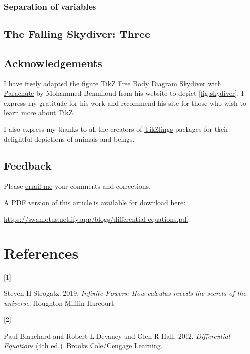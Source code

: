 \documentclass[
  a4paper,
]{article}
\newlength{\cslhangindent}
\newlength{\csllabelwidth}
\newenvironment{CSLReferences}[2] %
 {\begin{list}{}{%
  \setlength{\itemindent}{0pt}
  \setlength{\leftmargin}{0pt}
  \setlength{\parsep}{0pt}
  \ifodd #1
   \setlength{\leftmargin}{\cslhangindent}
   \setlength{\itemindent}{-1\cslhangindent}
  \fi
  \setlength{\itemsep}{#2\baselineskip}}}
 {\end{list}}
\newcommand{\CSLLeftMargin}[1]{\parbox[t]{\csllabelwidth}{\strut#1\strut}}
\newcommand{\CSLRightInline}[1]{\parbox[t]{\linewidth - \csllabelwidth}{\strut#1\strut}}
\begin{document}
\subsubsection{Separation of variables}\label{separation-of-variables}

\subsection{The Falling Skydiver:
Three}\label{the-falling-skydiver-three}

\subsection{Acknowledgements}\label{acknowledgements}

I have freely adapted the figure
\href{https://latexdraw.com/tikz-free-body-diagram-skydiver-with-parachute/}{TikZ
Free Body Diagram Skydiver with Parachute} by Mohammed Benmiloud from
his website to depict \cref{fig:skydiver}. I express my gratitude for
his work and recommend his site for those who wish to learn more about
\href{https://en.wikipedia.org/wiki/PGF/TikZ}{TikZ}.

I also express my thanks to all the creators of
\href{https://github.com/samcarter/tikzlings}{TikZlings} packages for
their delightful depictions of animals and beings.

\subsection{Feedback}\label{feedback}

Please \href{mailto:feedback.swanlotus@gmail.com}{email me} your
comments and corrections.

\noindent A PDF version of this article is
\href{./differetial-equations.pdf}{available for download here}:

\begin{sffamily}

\url{https://swanlotus.netlify.app/blogs/differential-equations.pdf}

\end{sffamily}

\section*{References}\label{bibliography}

\label{refs}
\begin{CSLReferences}{0}{0}
\CSLLeftMargin{{[}1{]} }%
\CSLRightInline{Steven H Strogatz. 2019. \emph{{Infinite Powers}: {How
calculus reveals the secrets of the universe}}. Houghton Mifflin
Harcourt.}

\CSLLeftMargin{{[}2{]} }%
\CSLRightInline{Paul Blanchard and Robert L Devaney and Glen R Hall.
2012. \emph{{Differential Equations}} (4th ed.). Brooks Cole/Cengage
Learning.}

\end{CSLReferences}
\end{document}
